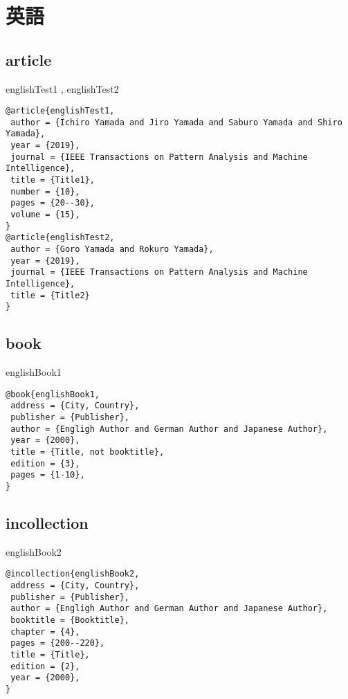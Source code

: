 \documentclass[10pt,a4paper]{article}
\begin{document}
\section{英語}
\subsection{article}

englishTest1 \cite{englishTest1}, 
englishTest2 \cite{englishTest2}

\begin{lstlisting}
@article{englishTest1,
 author = {Ichiro Yamada and Jiro Yamada and Saburo Yamada and Shiro Yamada},
 year = {2019},
 journal = {IEEE Transactions on Pattern Analysis and Machine Intelligence},
 title = {Title1},
 number = {10},
 pages = {20--30},
 volume = {15},
}
@article{englishTest2,
 author = {Goro Yamada and Rokuro Yamada},
 year = {2019},
 journal = {IEEE Transactions on Pattern Analysis and Machine Intelligence},
 title = {Title2}
}
\end{lstlisting}

\subsection{book}
englishBook1 \cite{englishBook1}

\begin{lstlisting}
@book{englishBook1,
 address = {City, Country},
 publisher = {Publisher},
 author = {Engligh Author and German Author and Japanese Author},
 year = {2000},
 title = {Title, not booktitle},
 edition = {3},
 pages = {1-10},
}
\end{lstlisting}

\subsection{incollection}
englishBook2 \cite{englishBook2}

\begin{lstlisting}
@incollection{englishBook2,
 address = {City, Country},
 publisher = {Publisher},
 author = {Engligh Author and German Author and Japanese Author},
 booktitle = {Booktitle},
 chapter = {4},
 pages = {200--220},
 title = {Title},
 edition = {2},
 year = {2000},
}
\end{lstlisting}

% 
% 



\end{document}
